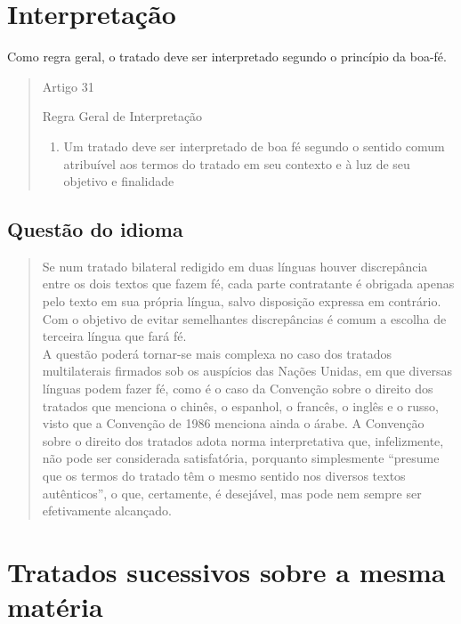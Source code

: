 \documentclass{article}
\begin{document}
\section{Interpretação}

Como regra geral, o tratado deve ser interpretado segundo o princípio da boa-fé.

\begin{quote}
    \begin{center}
         Artigo 31

        Regra Geral de Interpretação
    \end{center}    
    \begin{enumerate}[1.]
        \item Um tratado deve ser interpretado de boa fé segundo o sentido comum atribuível aos termos do tratado em seu contexto e à luz de seu objetivo e finalidade
    \end{enumerate}\cite{brasil_decreto_2009}
\end{quote}

\subsection{Questão do idioma}

\begin{quote}
    Se num tratado bilateral redigido em duas línguas houver discrepância entre os dois textos que fazem fé, cada parte contratante é obrigada apenas pelo texto em sua própria língua, salvo disposição expressa em contrário. Com o objetivo de evitar semelhantes discrepâncias é comum a escolha de terceira língua que fará fé.\\

    A questão poderá tornar-se mais complexa no caso dos tratados multilaterais firmados sob os auspícios das Nações Unidas, em que diversas línguas podem fazer fé, como é o caso da Convenção sobre o direito dos tratados que menciona o chinês, o espanhol, o francês, o inglês e o russo, visto que a Convenção de 1986 menciona ainda o árabe. A Convenção sobre o direito dos tratados adota norma interpretativa que, infelizmente, não pode ser considerada satisfatória, porquanto simplesmente “presume que os termos do tratado têm o mesmo sentido nos diversos textos autênticos”, o que, certamente, é desejável, mas pode nem sempre ser efetivamente alcançado.\cite[p.~164]{accioly_manual_2023}
\end{quote}

\section{Tratados sucessivos sobre a mesma matéria}
\end{document}
